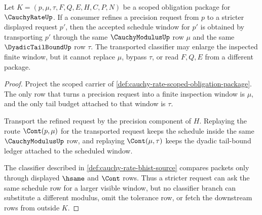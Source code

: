 \begin{theorem}
\label{thm:cauchy-rate-window-monotonicity}
Let $K=(p,\mu,\tau,F,Q,E,H,C,P,N)$ be a scoped obligation package for $\CauchyRateUp$. If a consumer refines a precision request from $p$ to a stricter displayed request $p'$, then the accepted schedule window for $p'$ is obtained by transporting $p'$ through the same $\CauchyModulusUp$ row $\mu$ and the same $\DyadicTailBoundUp$ row $\tau$. The transported classifier may enlarge the inspected finite window, but it cannot replace $\mu$, bypass $\tau$, or read $F,Q,E$ from a different package.
\end{theorem}
\begin{proof}
Project the scoped carrier of \autoref{def:cauchy-rate-scoped-obligation-package}. The only row that turns a precision request into a finite inspection window is $\mu$, and the only tail budget attached to that window is $\tau$.

Transport the refined request by the precision component of $H$. Replaying the route $\Cont(p,\mu)$ for the transported request keeps the schedule inside the same $\CauchyModulusUp$ row, and replaying $\Cont(\mu,\tau)$ keeps the dyadic tail-bound ledger attached to the scheduled window.

The classifier described in \autoref{def:cauchy-rate-bhist-source} compares packets only through displayed $\hsame$ and $\Cont$ rows. Thus a stricter request can ask the same schedule row for a larger visible window, but no classifier branch can substitute a different modulus, omit the tolerance row, or fetch the downstream rows from outside $K$.
\end{proof}

